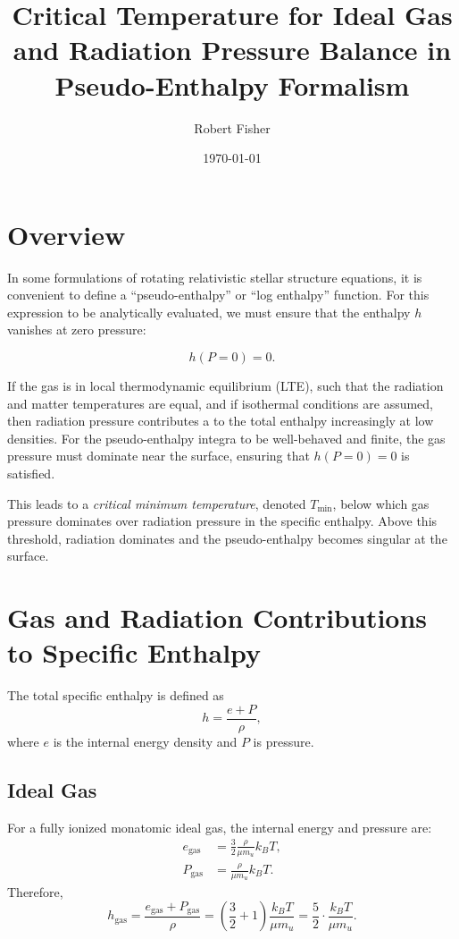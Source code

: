 \documentclass[12pt]{article}
\title{Critical Temperature for Ideal Gas and Radiation Pressure Balance in Pseudo-Enthalpy Formalism}
\author{Robert Fisher}
\date{\today}
\begin{document}
\maketitle

\section*{Overview}

In some formulations of rotating relativistic stellar structure equations, it is convenient to define a ``pseudo-enthalpy'' or ``log enthalpy'' function. For this expression to be analytically evaluated, we must ensure that the enthalpy $h$ vanishes at zero pressure:

\begin{equation}
    h(P = 0) = 0.
\end{equation}

If the gas is in local thermodynamic equilibrium (LTE), such that the radiation and matter temperatures are equal, and if isothermal conditions are assumed, then radiation pressure contributes a to the total enthalpy increasingly at low densities. For the pseudo-enthalpy integra to be well-behaved and finite, the gas pressure must dominate near the surface, ensuring that $h(P = 0) = 0$ is satisfied.

This leads to a \emph{critical minimum temperature}, denoted \( T_{\min} \), below which gas pressure dominates over radiation pressure in the specific enthalpy. Above this threshold, radiation dominates and the pseudo-enthalpy becomes singular at the surface.

\section*{Gas and Radiation Contributions to Specific Enthalpy}

The total specific enthalpy is defined as
\begin{equation}
    h = \frac{e + P}{\rho},
\end{equation}
where \( e \) is the internal energy density and \( P \) is pressure.

\subsection*{Ideal Gas}

For a fully ionized monatomic ideal gas, the internal energy and pressure are:
\begin{align}
    e_{\text{gas}} &= \frac{3}{2} \frac{\rho}{\mu m_u} k_B T, \\
    P_{\text{gas}} &= \frac{\rho}{\mu m_u} k_B T.
\end{align}
Therefore,
\begin{equation}
    h_{\text{gas}} = \frac{e_{\text{gas}} + P_{\text{gas}}}{\rho} 
    = \left( \frac{3}{2} + 1 \right) \frac{k_B T}{\mu m_u}
    = \frac{5}{2} \cdot \frac{k_B T}{\mu m_u}.
\end{equation}
\end{document}
